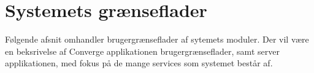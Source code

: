 \chapter{Systemets grænseflader}
Følgende afsnit omhandler brugergrænseflader af sytemets moduler. Der vil være en beksrivelse af Converge applikationen brugergrænseflader, samt server applikationen, med fokus på de mange services som systemet består af.  